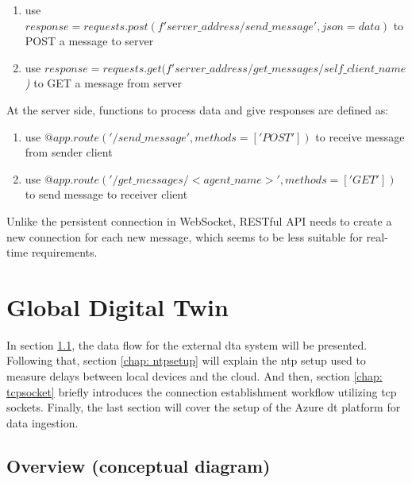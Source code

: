 \begin{enumerate}
    \item use \textit{$response = requests.post(f'{server\_address}/send\_message', json=data)$} to POST a message to server
    \item use \textit{$response = requests.get(f'{server\_address}/get\_messages/{self\_client\_name}$)} to GET a message from server
\end{enumerate}

At the server side, functions to process data and give responses are defined as:
\begin{enumerate}
    \item use \textit{$@app.route('/send\_message', methods=['POST'])$} to receive message from sender client
    \item use \textit{$@app.route('/get\_messages/<agent\_name>', methods=['GET'])$} to send message to receiver client
\end{enumerate}

Unlike the persistent connection in WebSocket, RESTful API needs to create 
a new connection for each new message, which seems to be less suitable for real-time 
requirements. 





\section{Global Digital Twin} \label{chap: Meth-External}
In section \ref{chap: Overview-External}, the data flow for the external 
\gls{dta} system will be presented. Following that, section \ref{chap: ntpsetup} 
will explain the \gls{ntp} setup used to measure delays between local devices and 
the cloud. And then, section \ref{chap: tcpsocket} briefly introduces the 
connection establishment workflow utilizing \gls{tcp} sockets. Finally, the 
last section will cover the setup of the Azure \gls{dt} platform for data ingestion.



\subsection{Overview (conceptual diagram)}\label{chap: Overview-External}

